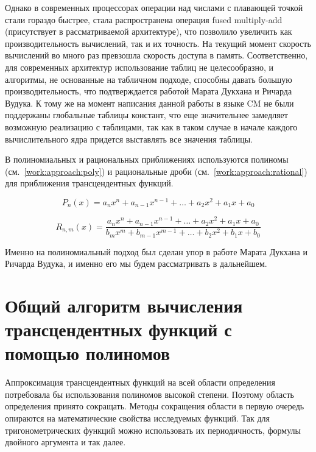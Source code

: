 Однако в современных процессорах операции над числами с плавающей точкой стали гораздо быстрее, стала распространена операция \foreignlanguage{english}{fused multiply-add} (присутствует в рассматриваемой архитектуре), что позволило увеличить как производительность вычислений, так и их точность.
На текущий момент скорость вычислений во много раз превзошла скорость доступа в память.
Соответственно, для современных архитектур использование таблиц не целесообразно, и алгоритмы, не основанные на табличном подходе, способны давать большую производительность, что подтверждается работой Марата Дукхана и Ричарда Вудука\cite{use-poly}.
К тому же на момент написания данной работы в языке CM не были поддержаны глобальные таблицы констант, что еще значительнее замедляет возможную реализацию с таблицами, так как в таком случае в начале каждого вычислительного ядра придется выставлять все значения таблицы.

В полиномиальных и рациональных приближениях используются полиномы (см.~\ref{work:approach:poly}) и рациональные дроби (см.~\ref{work:approach:rational}) для приближения трансцендентных функций.

\begin{equation}
    \label{work:approach:poly}
    P_{n}(x) = a_{n} x^n + a_{n-1} x^{n-1} + \ldots +
    a_2 x^2 + a_1 x + a_0
\end{equation}

\begin{equation}
    \label{work:approach:rational}
    R_{n,m}(x) = \frac{a_{n} x^n + a_{n-1} x^{n-1} + \ldots +
    a_2 x^2 + a_1 x + a_0}{b_{m} x^m + b_{m-1} x^{m-1} + \ldots +
    b_2 x^2 + b_1 x + b_0}
\end{equation}

Именно на полиномиальный подход был сделан упор в работе Марата Дукхана и Ричарда Вудука\cite{use-poly}, и именно его мы будем рассматривать в дальнейшем.

\section{Общий алгоритм вычисления трансцендентных функций с помощью полиномов}

Аппроксимация трансцендентных функций на всей области определения потребовала бы использования полиномов высокой степени.
Поэтому область определения принято сокращать.
Методы сокращения области в первую очередь опираются на математические свойства исследуемых функций\cite{hart}.
Так для тригонометрических функций можно использовать их периодичность, формулы двойного аргумента и так далее.

